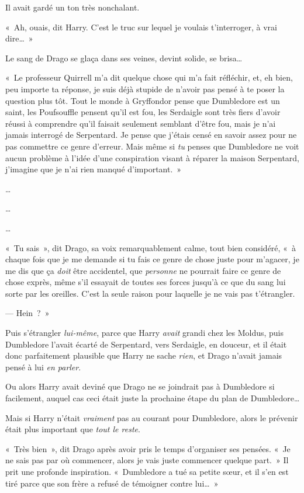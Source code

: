 Il avait gardé un ton très nonchalant.

«~Ah, ouais, dit Harry.
C'est le truc sur lequel je voulais t'interroger, à vrai dire…~»

Le sang de Drago se glaça dans ses veines, devint solide, se brisa…

«~Le professeur Quirrell m'a dit quelque chose qui m'a fait réfléchir, et, eh bien, peu importe ta réponse, je suis déjà stupide de n'avoir pas pensé à te poser la question plus tôt.
Tout le monde à Gryffondor pense que Dumbledore est un saint, les Poufsouffle pensent qu'il est fou, les Serdaigle sont très fiers d'avoir réussi à comprendre qu'il faisait seulement semblant d'être fou, mais je n'ai jamais interrogé de Serpentard.
Je pense que j'étais censé en savoir assez pour ne pas commettre ce genre d'erreur.
Mais même si \emph{tu} penses que Dumbledore ne voit aucun problème à l'idée d'une conspiration visant à réparer la maison Serpentard, j'imagine que je n'ai rien manqué d'important.~»

…

…

…

«~Tu sais~», dit Drago, sa voix remarquablement calme, tout bien considéré, «~à chaque fois que je me demande si tu fais ce genre de chose juste pour m'agacer, je me dis que ça \emph{doit} être accidentel, que \emph{personne} ne pourrait faire ce genre de chose exprès, même s'il essayait de toutes ses forces jusqu'à ce que du sang lui sorte par les oreilles.
C'est la seule raison pour laquelle je ne vais pas t'étrangler.

--- Hein~?~»

Puis s'étrangler \emph{lui-même}, parce que Harry \emph{avait} grandi chez les Moldus, puis Dumbledore l'avait écarté de Serpentard, vers Serdaigle, en douceur, et il était donc parfaitement plausible que Harry ne sache \emph{rien}, et Drago n'avait jamais pensé à lui \emph{en parler}.

Ou alors Harry avait deviné que Drago ne se joindrait pas à Dumbledore si facilement, auquel cas ceci était juste la prochaine étape du plan de Dumbledore…

Mais si Harry n'était \emph{vraiment} pas au courant pour Dumbledore, alors le prévenir était plus important que \emph{tout le reste}.

«~Très bien~», dit Drago après avoir pris le temps d'organiser ses pensées.
«~Je ne sais pas par où commencer, alors je vais juste commencer quelque part.~»
Il prit une profonde inspiration.
«~Dumbledore a tué sa petite sœur, et il s'en est tiré parce que son frère a refusé de témoigner contre lui…~»

